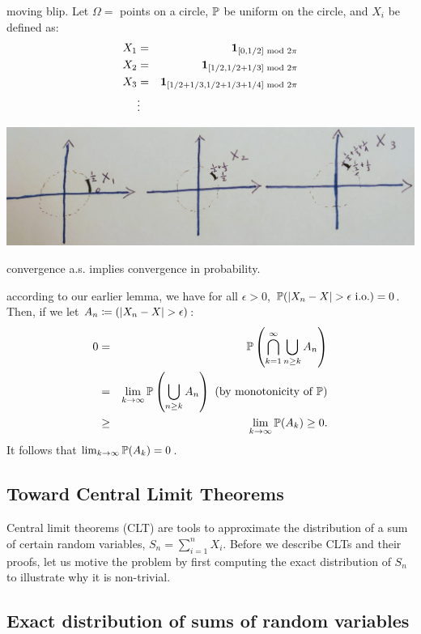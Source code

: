 \documentclass{article}
\begin{document}
 moving blip. Let $\Omega = $ points on a circle, $\P$ be uniform on the circle, and $X_i$ be defined as:
\begin{eqnarray*}
X_1 &=& \1_{[0,1/2]\text{ mod }2\pi}\\
X_2 &=& \1_{[1/2,1/2+1/3]\text{ mod }2\pi}\\
X_3 &=& \1_{[1/2+1/3,1/2+1/3+1/4]\text{ mod }2\pi}\\
&\vdots&
\end{eqnarray*}
\begin{center}
	\includegraphics[width=0.8\linewidth]{figures/moving-blip} 
\end{center}

 convergence a.s. implies convergence in probability.

 according to our earlier lemma, we have for all $\epsilon > 0$, $\P(|X_n - X| > \epsilon\io) = 0$. Then, if we let $A_n \defeq (|X_n - X| > \epsilon)$:
\begin{eqnarray*}
0 &=& \P\left( \bigcap_{k=1}^\infty \bigcup_{n \ge k} A_n \right) \\
&=& \lim_{k\to\infty} \P\left( \bigcup_{n\ge k} A_n \right) \text{ (by monotonicity of }\P\text{)} \\
&\ge& \lim_{k\to\infty} \P(A_k) \ge 0.
\end{eqnarray*}
It follows that $\lim_{k\to\infty} \P(A_k) = 0$.


\subsection{Toward Central Limit Theorems} 

Central limit theorems (CLT) are tools to approximate the distribution of a sum of certain random variables, $S_n = \sum_{i=1}^n X_i$. Before we describe CLTs and their proofs, let us motive the problem by first computing the exact distribution of $S_n$ to illustrate why it is non-trivial.


\subsection{Exact distribution of sums of random variables}
\end{document}
